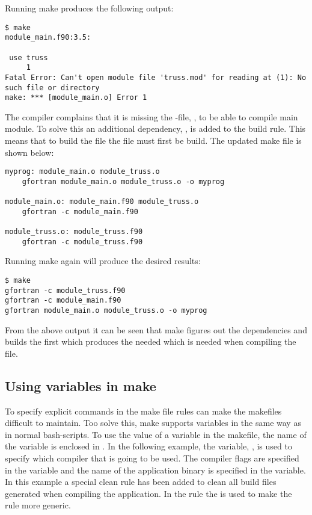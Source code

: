Running make produces the following output:

\cmdmode

\begin{lstlisting}
$ make
module_main.f90:3.5:

 use truss
     1
Fatal Error: Can't open module file 'truss.mod' for reading at (1): No such file or directory
make: *** [module_main.o] Error 1
\end{lstlisting}

The compiler complains that it is missing the -file, , to be able to compile main module. To solve this an additional dependency, , is added to the  build rule. This means that to build the  file the  file must first be build. The updated make file is shown below:

\mmode

\begin{lstlisting}
myprog: module_main.o module_truss.o
	gfortran module_main.o module_truss.o -o myprog

module_main.o: module_main.f90 module_truss.o
	gfortran -c module_main.f90

module_truss.o: module_truss.f90
	gfortran -c module_truss.f90
\end{lstlisting}

Running make again will produce the desired results:

\cmdmode

\begin{lstlisting}
$ make
gfortran -c module_truss.f90
gfortran -c module_main.f90
gfortran module_main.o module_truss.o -o myprog
\end{lstlisting}%

From the above output it can be seen that make figures out the dependencies and builds the  first which produces the needed  which is needed when compiling the  file.

\subsection{Using variables in make}

To specify explicit commands in the make file rules can make the makefiles difficult to maintain. Too solve this, make supports variables in the same way as in normal bash-scripts. To use the value of a variable in the makefile, the name of the variable is enclosed in . In the following example, the variable, , is used to specify which compiler that is going to be used. The compiler flags are specified in the  variable and the name of the application binary is specified in the  variable. In this example a special clean rule has been added to clean all build files generated when compiling the application. In the rule the  is used to make the rule more generic. 

